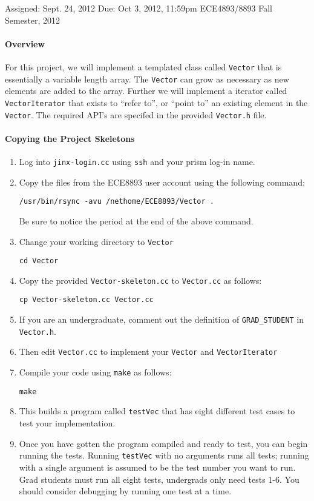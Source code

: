 \documentclass[10pt]{article}
\begin{document}
{Assigned: Sept. 24, 2012}
{Due: Oct 3, 2012, 11:59pm}
{ECE4893/8893}
{Fall Semester, 2012}

\paragraph{Overview}
For this project, we will implement a templated class called {\tt Vector}
that is essentially a variable length array.  The {\tt Vector}
can grow as necessary as new elements are added to the array.  Further
we will implement a iterator called {\tt VectorIterator} that exists to
``refer to'', or ``point to'' an existing element in the {\tt Vector}.
The required API's are specifed in the provided {\tt Vector.h} file.

\paragraph{Copying the Project Skeletons}
\begin{enumerate}
\item Log into {\tt jinx-login.cc} using {\tt ssh} and your prism log-in name.
\item Copy the files from the ECE8893 user account using the following
command:
\begin{verbatim}
/usr/bin/rsync -avu /nethome/ECE8893/Vector .
\end{verbatim}
Be sure to notice the period at the end of the above command.
\item Change your working directory to {\tt Vector}
\begin{verbatim}
cd Vector
\end{verbatim}
\item Copy the provided {\tt Vector-skeleton.cc} to {\tt Vector.cc} as follows:
\begin{verbatim}
cp Vector-skeleton.cc Vector.cc
\end{verbatim}
\item If you are an undergraduate, comment out the definition of
{\tt GRAD\_STUDENT} in {\tt Vector.h}.
\item Then edit {\tt Vector.cc} to implement your {\tt Vector} and
{\tt VectorIterator}
\item Compile your code using {\tt make} as follows:
\begin{verbatim}
make
\end{verbatim}
\item This builds a program called {\tt testVec} that has eight
different test cases to test your implementation.
\item Once you have gotten the program compiled and ready to test,
you can begin running the tests.  Running {\tt testVec} with no arguments
runs all tests; running with a single argument is assumed to be the
test number you want to run.  Grad students must run all eight tests,
undergrads only need tests 1-6.  You should consider debugging by running
one test at a time.
\end{enumerate}
\end{document}
